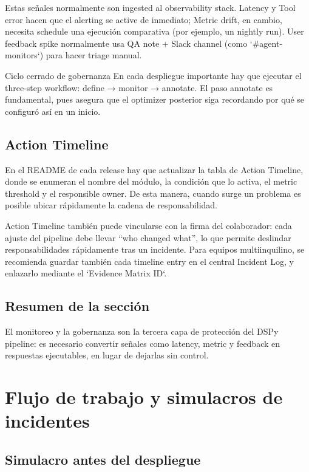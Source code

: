 \documentclass[a4paper]{article}
\begin{document}
Estas señales normalmente son ingested al observability stack. Latency y Tool error hacen que el alerting se active de inmediato; Metric drift, en cambio, necesita schedule una ejecución comparativa (por ejemplo, un nightly run). User feedback spike normalmente usa QA note + Slack channel (como `\#agent-monitors`) para hacer triage manual.

\begin{warningbox}{Ciclo cerrado de gobernanza}
En cada despliegue importante hay que ejecutar el three-step workflow: define → monitor → annotate. El paso annotate es fundamental, pues asegura que el optimizer posterior siga recordando por qué se configuró así en un inicio.
\end{warningbox}

\subsection{Action Timeline}

En el README de cada release hay que actualizar la tabla de Action Timeline, donde se enumeran el nombre del módulo, la condición que lo activa, el metric threshold y el responsible owner. De esta manera, cuando surge un problema es posible ubicar rápidamente la cadena de responsabilidad.

Action Timeline también puede vincularse con la firma del colaborador: cada ajuste del pipeline debe llevar ``who changed what'', lo que permite deslindar responsabilidades rápidamente tras un incidente. Para equipos multiinquilino, se recomienda guardar también cada timeline entry en el central Incident Log, y enlazarlo mediante el `Evidence Matrix ID`.

\subsection{Resumen de la sección}

El monitoreo y la gobernanza son la tercera capa de protección del DSPy pipeline: es necesario convertir señales como latency, metric y feedback en respuestas ejecutables, en lugar de dejarlas sin control.

\section{Flujo de trabajo y simulacros de incidentes}

\subsection{Simulacro antes del despliegue}
\end{document}
